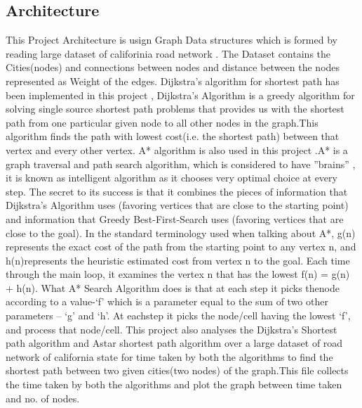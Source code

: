 \documentclass[14pt,a4]{extreport}
\begin{document}
\subsection{Architecture}
This Project Architecture is usign Graph Data structures which is formed by reading large dataset of califorinia road network . The Dataset contains the Cities(nodes) and connections between nodes and distance between the nodes represented as Weight of the edges.
\newline
Dijkstra's algorithm for shortest path has been implemented in this project , Dijkstra's Algorithm is a greedy algorithm for solving single source shortest path problems that provides us with the shortest path from one particular given node to all other nodes in the graph.This algorithm finds the path with lowest cost(i.e. the shortest path) between that vertex and every other vertex.
\newline
A* algorithm is also used in this project .A* is a graph traversal and path search algorithm, which is considered to have ”brains” , it is known as intelligent algorithm as it chooses very optimal choice at every step.  The secret to its success is that it combines the pieces of information that Dijkstra’s Algorithm uses (favoring vertices that are close to the starting point) and information that Greedy Best-First-Search uses (favoring vertices that are close to the goal).  In the standard terminology used when talking about A*, g(n) represents the exact cost of the path from the starting point to any vertex n, and h(n)represents the heuristic estimated cost from vertex n to the goal.  Each time through the main loop, it examines the vertex n that has the lowest f(n) = g(n) + h(n).  What A* Search Algorithm does is that at each step it picks thenode according to a value-‘f’ which is a parameter equal to the sum of two other parameters – ‘g’ and ‘h’.  At eachstep it picks the node/cell having the lowest ‘f’, and process that node/cell.
\newline
This project also analyses the Dijkstra's Shortest path algorithm and Astar shortest path algorithm over a large dataset of road network of california state for time taken by both the algorithms to find the shortest path between two given cities(two nodes) of the graph.This file collects the time taken by both the algorithms and plot the graph between time taken and no. of nodes.


\newline
\newline
\end{document}
